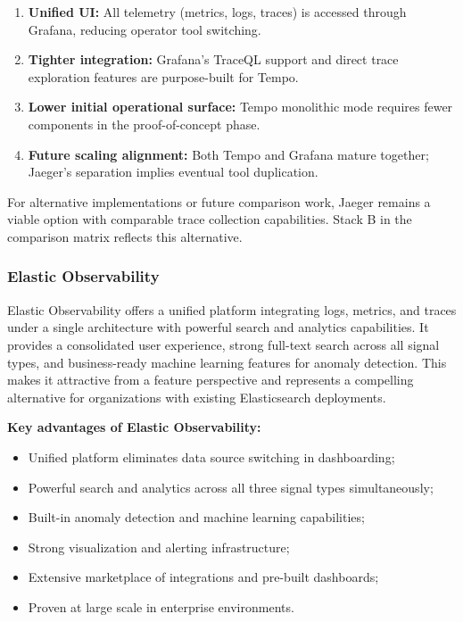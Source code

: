 \begin{enumerate}
    \item \textbf{Unified UI:} All telemetry (metrics, logs, traces) is accessed through Grafana, reducing operator tool switching.
    \item \textbf{Tighter integration:} Grafana's TraceQL support and direct trace exploration features are purpose-built for Tempo.
    \item \textbf{Lower initial operational surface:} Tempo monolithic mode requires fewer components in the proof-of-concept phase.
    \item \textbf{Future scaling alignment:} Both Tempo and Grafana mature together; Jaeger's separation implies eventual tool duplication.
\end{enumerate}

For alternative implementations or future comparison work, Jaeger remains a viable option with comparable trace collection capabilities. Stack B in the comparison matrix reflects this alternative.

\subsubsection{Elastic Observability}
\label{subsubsec:elastic}

Elastic Observability offers a unified platform integrating logs, metrics, and traces under a single architecture with powerful search and analytics capabilities. It provides a consolidated user experience, strong full-text search across all signal types, and business-ready machine learning features for anomaly detection. This makes it attractive from a feature perspective and represents a compelling alternative for organizations with existing Elasticsearch deployments.

\textbf{Key advantages of Elastic Observability:}
\begin{itemize}
    \item Unified platform eliminates data source switching in dashboarding;
    \item Powerful search and analytics across all three signal types simultaneously;
    \item Built-in anomaly detection and machine learning capabilities;
    \item Strong visualization and alerting infrastructure;
    \item Extensive marketplace of integrations and pre-built dashboards;
    \item Proven at large scale in enterprise environments.
\end{itemize}

